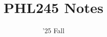 \documentclass[11pt]{scrartcl}
\begin{document}
\title{PHL245 Notes}
\date{'25 Fall} %
\maketitle

\setcounter{tocdepth}{1}
\tableofcontents
\newpage

 \newpage

\end{document}
